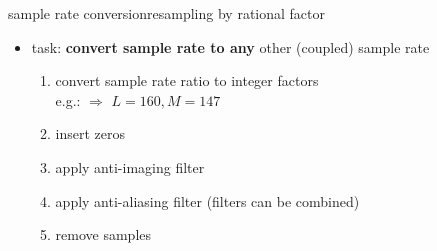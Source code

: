 	\begin{frame}{sample rate conversion}{resampling by rational factor}
        \begin{itemize}
            \item   task: \textbf{convert sample rate to any} other (coupled) sample rate
            \pause 
            \begin{enumerate}
                \item   convert sample rate ratio to integer factors\\ e.g.:   $\Rightarrow$ $L=160, M=147$
                \pause
                \item   insert zeros
                \item   apply anti-imaging filter
                \pause
                \item   apply anti-aliasing filter (filters can be combined)
                \item   remove samples
            \end{enumerate}
        \end{itemize}
        \bigskip
        \vspace{50mm}
    \end{frame}
